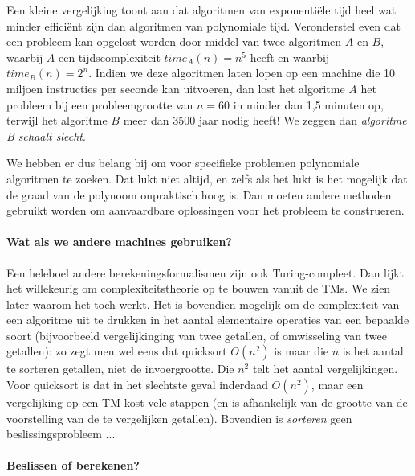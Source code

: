  





Een kleine vergelijking toont aan dat algoritmen van exponenti\"ele
tijd heel wat minder effici\"ent zijn dan algoritmen van polynomiale
tijd. Veronderstel even dat een probleem kan opgelost worden door
middel van twee algoritmen $A$ en $B$, waarbij $A$ een
tijdscomplexiteit $time_A(n)=n^5$ heeft en waarbij
$time_B(n)=2^n$. Indien we deze algoritmen laten lopen op een machine
die 10 miljoen instructies per seconde kan uitvoeren, dan lost het
algoritme $A$ het probleem bij een probleemgrootte van $n=60$ in
minder dan 1,5 minuten op, terwijl het algoritme $B$ meer dan 3500
jaar nodig heeft! We zeggen dan {\em algoritme B schaalt slecht}.


We hebben er dus belang bij om voor specifieke problemen polynomiale
algoritmen te zoeken. Dat lukt niet altijd, en zelfs als het lukt is
het mogelijk dat de graad van de polynoom onpraktisch hoog is. Dan
moeten andere methoden gebruikt worden om aanvaardbare oplossingen
voor het probleem te construeren.



\paragraph{Wat als we andere machines gebruiken?}
Een heleboel andere berekeningsformalismen zijn ook
Turing-compleet. Dan lijkt het willekeurig om complexiteitstheorie op
te bouwen vanuit de TMs. We zien later waarom het toch werkt. Het is
bovendien mogelijk om de complexiteit van een algoritme uit te drukken
in het aantal elementaire operaties van een bepaalde soort
(bijvoorbeeld vergelijkinging van twee getallen, of omwisseling van
twee getallen): zo zegt men wel eens dat quicksort $O(n^2)$ is maar
die $n$ is het aantal te sorteren getallen, niet de
invoergrootte. Die $n^2$ telt het aantal vergelijkingen. Voor
quicksort is dat in het slechtste geval inderdaad $O(n^2)$, maar een
vergelijking op een TM kost vele stappen (en is afhankelijk van de
grootte van de voorstelling van de te vergelijken getallen). Bovendien
is {\em sorteren} geen beslissingsprobleem ...


\paragraph{Beslissen of berekenen?}

